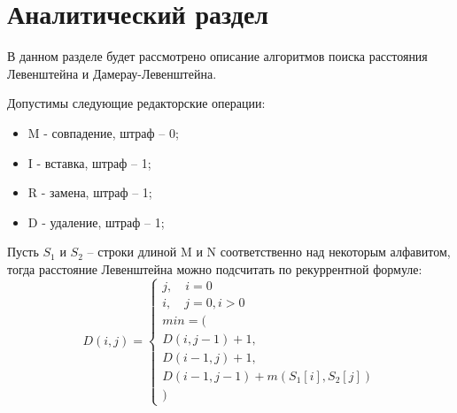 \chapter{Аналитический раздел}
\label{cha:analysis}
В данном разделе будет рассмотрено описание алгоритмов поиска расстояния Левенштейна и Дамерау-Левенштейна.
\par Допустимы следующие редакторские операции:
\begin{itemize}
	\item M - совпадение, штраф -- 0;
	\item I - вставка, штраф -- 1;
	\item R - замена, штраф -- 1;
	\item D - удаление, штраф -- 1;
\end{itemize}
\par Пусть $ S_{1} $  и $ S_{2} $ -- строки длиной M и N соответственно над некоторым алфавитом, тогда расстояние Левенштейна можно подсчитать по рекуррентной формуле:
\begin{equation}
D(i, j) = \begin{cases}
j, \quad i = 0\\
i, \quad j = 0, i > 0\\
min = (\\
D(i,j-1) + 1,\\
D(i-1, j) + 1,\\
D(i-1, j-1)+m(S_{1}[i],S_{2}[j])\\
)
\end{cases}
\end{equation}

